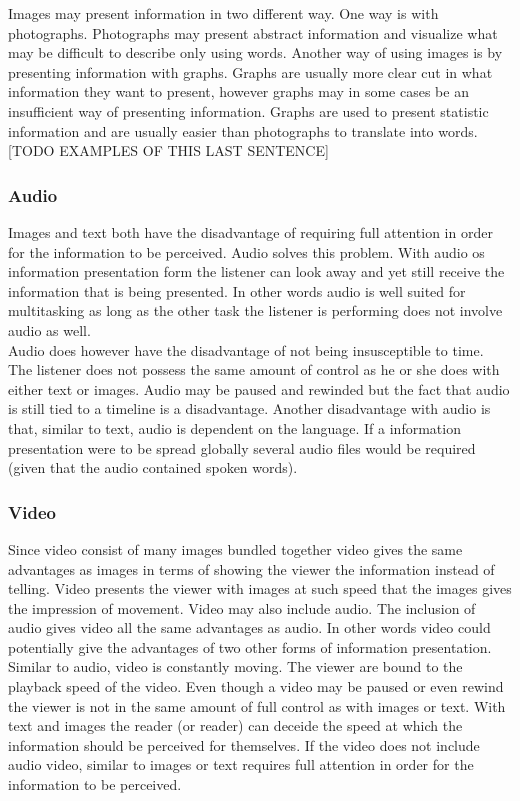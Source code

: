Images may present information in two different way. One way is with photographs. Photographs may present abstract information and visualize what may be difficult to describe only using words. Another way of using images is by presenting information with graphs. Graphs are usually more clear cut in what information they want to present, however graphs may in some cases be an insufficient way of presenting information. Graphs are used to present statistic information and are usually easier than photographs to translate into words. [TODO EXAMPLES OF THIS LAST SENTENCE]



\subsubsection{Audio}
Images and text both have the disadvantage of requiring full attention in order for the information to be perceived. Audio solves this problem. With audio os information presentation form the listener can look away and yet still receive the information that is being presented. In other words audio is well suited for multitasking as long as the other task the listener is performing does not involve audio as well.\\

Audio does however have the disadvantage of not being insusceptible to time. The listener does not possess the same amount of control as he or she does with either text or images. Audio may be paused and rewinded but the fact that audio is still tied to a timeline is a disadvantage. Another disadvantage with audio is that, similar to text, audio is dependent on the language. If a information presentation were to be spread globally several audio files would be required (given that the audio contained spoken words).

\subsubsection{Video}
Since video consist of many images bundled together video gives the same advantages as images in terms of showing the viewer the information instead of telling. Video presents the viewer with images at such speed that the images gives the impression of movement. Video may also include audio. The inclusion of audio gives video all the same advantages as audio. In other words video could potentially give the advantages of two other forms of information presentation.\\

Similar to audio, video is constantly moving. The viewer are bound to the playback speed of the video. Even though a video may be paused or even rewind the viewer is not in the same amount of full control as with images or text. With text and images the reader (or reader) can deceide the speed at which the information should be perceived for themselves. If the video does not include audio video, similar to images or text requires full attention in order for the information to be perceived.